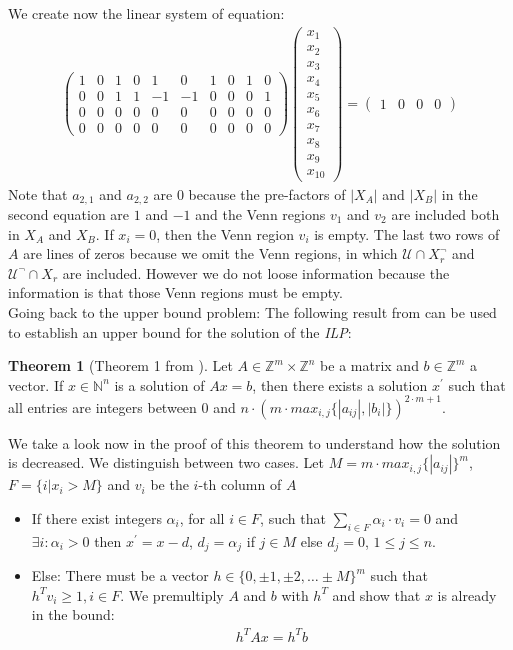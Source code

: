 \documentclass{book}
\theoremstyle{break}
\theoremstyle{definition}
\newtheorem{mythe}{Theorem}
\begin{document}
We create now the linear system of equation:
\begin{align*}
\left ( \begin{array}{cccccccccc}
1&0&1&0&1&0&1&0&1&0\\
0&0&1&1&-1&-1&0&0&0&1\\
0&0&0&0&0&0&0&0&0&0\\
0&0&0&0&0&0&0&0&0&0
\end{array} \right )\left ( \begin{array}{c}
x_1\\x_2\\x_3\\x_4\\x_5\\x_6\\x_7\\x_8\\x_9\\x_{10}
\end{array}\right )=\left ( \begin{array}{cccc}
1&0&0&0
\end{array}\right )
\end{align*}
Note that $a_{2,1}$ and $a_{2,2}$ are $0$ because the pre-factors of $|X_A|$ and $|X_B|$ in the second equation are $1$ and $-1$ and the Venn regions $v_1$ and $v_2$ are included both in $X_A$ and $X_B$. If $x_i=0$, then the Venn region $v_i$ is empty. The last two rows of $A$ are lines of zeros because we omit the Venn regions, in which $\mathcal{U}\cap X_r^\neg$ and $\mathcal{U}^\neg\cap X_r$ are included. However we do not loose information because the information is that those Venn regions must be empty.\\
Going back to the upper bound problem: The following result from \cite{knapsack} can be used to establish an upper bound for the solution of the \textit{ILP}:
\begin{mythe}[Theorem 1 from \cite{knapsack}]\label{upper bound}
Let $A\in \mathbb{Z}^m\times \mathbb{Z}^n$ be a matrix and $b\in\mathbb{Z}^m$ a vector. If $x\in\mathbb{N}^n$ is a solution of $Ax=b$, then there exists a solution $x^\prime$ such that all entries are integers between $0$ and $n\cdot (m\cdot max_{i,j}\{|a_{ij}|,|b_i|\})^{2\cdot m+1}$.
\end{mythe}
We take a look now in the proof of this theorem to understand how the solution is decreased. We distinguish between two cases. Let $M=m\cdot max_{i,j}\{|a_{ij}|\}^m$, $F=\{i|x_i>M\}$ and $v_i$ be the $i$-th column of $A$
\begin{itemize}
\item If there exist integers $\alpha_i$, for all $i\in F$, such that $\sum_{i\in F}\alpha_i\cdot v_i=0$ and $\exists i: \alpha_i>0$ then $x^\prime=x-d$, $d_j=\alpha_j$ if $j\in M$ else $d_j=0$, $1\leq j\leq n$.
\item Else: There must be a vector $h\in\{0,\pm 1,\pm 2,\dots \pm M\}^m$ such that $h^T v_i\geq1, i\in F$. We premultiply $A$ and $b$ with $h^T$ and show that $x$ is already in the bound:
\begin{align*}
h^TA x = h^Tb
\end{align*}
\end{itemize}
\end{document}
